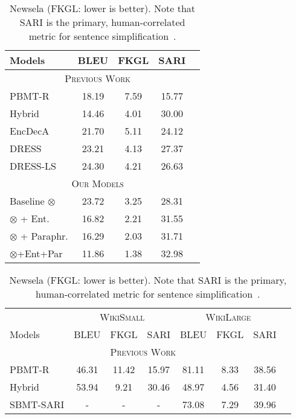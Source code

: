 \documentclass[11pt]{article}
\begin{document}
 
\begin{table}[t]
\begin{minipage}[t]{.365\linewidth}
\begin{center}
\begin{small}
\begin{tabular}{|l|c|c|c|c|}
\hline
Models & BLEU & FKGL & SARI\\
\hline
\multicolumn{4}{|c|}{\textsc{Previous Work}}\\
\hline
PBMT-R & 18.19 & 7.59 & 15.77 \\
Hybrid & 14.46 & 4.01 & 30.00 \\
EncDecA & 21.70 & 5.11 & 24.12 \\
DRESS & 23.21 & 4.13 & 27.37 \\
DRESS-LS & 24.30 & 4.21 & 26.63 \\
\hline
\multicolumn{4}{|c|}{\textsc{Our Models}}\\
\hline
Baseline $\otimes$ & 23.72 & 3.25 & 28.31 \\
$\otimes$ + Ent. & 16.82 & 2.21 & 31.55 \\
$\otimes$ + Paraphr. & 16.29 & 2.03 & 31.71 \\
$\otimes$+Ent+Par & 11.86 & 1.38 & 32.98 \\
\hline
\end{tabular}
\end{small}
\end{center}
\vspace{-10pt}
\caption{Newsela (FKGL: lower is better). Note that SARI is the primary, human-correlated metric for sentence simplification~\cite{Xu2016OptimizingSM}.}
\vspace{-5pt}
\label{table:newsela_results}
\end{minipage}
\hfill
\begin{minipage}[t]{.595\linewidth}
\begin{center}
\begin{small}
\begin{tabular}{|l|c|c|c|c|c|c|c|}
\hline
& \multicolumn{3}{c|}{\textsc{WikiSmall}} & \multicolumn{3}{c|}{\textsc{WikiLarge}}\\
Models & BLEU & FKGL & SARI &  BLEU & FKGL & SARI\\
\hline
\multicolumn{7}{|c|}{\textsc{Previous Work}}\\
\hline
PBMT-R  & 46.31 & 11.42 & 15.97 & 81.11 & 8.33 & 38.56 \\
Hybrid  & 53.94 & 9.21 & 30.46 & 48.97 & 4.56 & 31.40 \\
SBMT-SARI  & - & - & -  & 73.08 & 7.29 & 39.96\\

\end{tabular}
\end{small}
\end{center}
\end{minipage}
\end{table}
\end{document}
